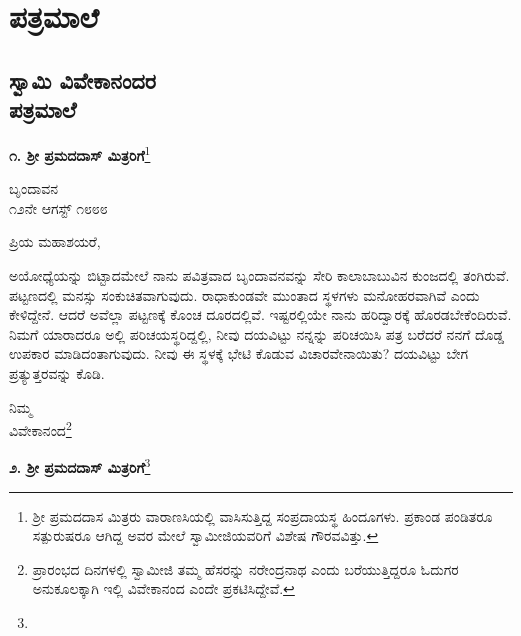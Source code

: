 

\part{ಪತ್ರಮಾಲೆ}

\vskip -0.5cm

\chapter[ಸ್ವಾಮಿ ವಿವೇಕಾನಂದರ ಪತ್ರಮಾಲೆ]{ಸ್ವಾಮಿ ವಿವೇಕಾನಂದರ\\ಪತ್ರಮಾಲೆ}

\begin{center}
\textbf{೧. ಶ‍್ರೀ ಪ್ರಮದದಾಸ್ ಮಿತ್ರರಿಗೆ}\footnote{ಶ‍್ರೀ ಪ್ರಮದದಾಸ ಮಿತ್ರರು ವಾರಾಣಸಿಯಲ್ಲಿ ವಾಸಿಸುತ್ತಿದ್ದ ಸಂಪ್ರದಾಯಸ್ಥ ಹಿಂದೂಗಳು. ಪ್ರಕಾಂಡ ಪಂಡಿತರೂ ಸತ್ಪುರುಷರೂ ಆಗಿದ್ದ ಅವರ ಮೇಲೆ ಸ್ವಾಮೀಜಿಯವರಿಗೆ ವಿಶೇಷ ಗೌರವವಿತ್ತು.}
\end{center}

\vspace{-0.7cm}
\begin{flushright}
ಬೃಂದಾವನ\\೧೨ನೇ ಆಗಸ್ಟ್ ೧೮೮೮
\end{flushright}

\noindent
ಪ್ರಿಯ ಮಹಾಶಯರೆ,

ಅಯೋಧ್ಯೆಯನ್ನು ಬಿಟ್ಟಾದಮೇಲೆ ನಾನು ಪವಿತ್ರವಾದ ಬೃಂದಾವನವನ್ನು ಸೇರಿ ಕಾಲಾಬಾಬುವಿನ ಕುಂಜದಲ್ಲಿ ತಂಗಿರುವೆ. ಪಟ್ಟಣದಲ್ಲಿ ಮನಸ್ಸು ಸಂಕುಚಿತವಾಗುವುದು. ರಾಧಾಕುಂಡವೇ ಮುಂತಾದ ಸ್ಥಳಗಳು ಮನೋಹರವಾಗಿವೆ ಎಂದು ಕೇಳಿದ್ದೇನೆ. ಆದರೆ ಅವೆಲ್ಲಾ ಪಟ್ಟಣಕ್ಕೆ ಕೊಂಚ ದೂರದಲ್ಲಿವೆ. ಇಷ್ಟರಲ್ಲಿಯೇ ನಾನು ಹರಿದ್ವಾರಕ್ಕೆ ಹೊರಡಬೇಕೆಂದಿರುವೆ. ನಿಮಗೆ ಯಾರಾದರೂ ಅಲ್ಲಿ ಪರಿಚಯಸ್ಥರಿದ್ದಲ್ಲಿ, ನೀವು ದಯವಿಟ್ಟು ನನ್ನನ್ನು ಪರಿಚಯಿಸಿ ಪತ್ರ ಬರೆದರೆ ನನಗೆ ದೊಡ್ಡ ಉಪಕಾರ ಮಾಡಿದಂತಾಗುವುದು. ನೀವು ಈ ಸ್ಥಳಕ್ಕೆ ಭೇಟಿ ಕೊಡುವ ವಿಚಾರವೇನಾಯಿತು? ದಯವಿಟ್ಟು ಬೇಗ ಪ್ರತ್ಯುತ್ತರವನ್ನು ಕೊಡಿ.

\vspace{-0.5cm}

{\flushright
ನಿಮ್ಮ\\ವಿವೇಕಾನಂದ\footnote{ಪ್ರಾರಂಭದ ದಿನಗಳಲ್ಲಿ ಸ್ವಾಮೀಜಿ ತಮ್ಮ ಹೆಸರನ್ನು ನರೇಂದ್ರನಾಥ ಎಂದು ಬರೆಯುತ್ತಿದ್ದರೂ ಓದುಗರ ಅನುಕೂಲಕ್ಕಾಗಿ ಇಲ್ಲಿ ವಿವೇಕಾನಂದ ಎಂದೇ ಪ್ರಕಟಿಸಿದ್ದೇವೆ.

}\par}

\vspace{-0.3cm}

\begin{center}
\textbf{೨. ಶ‍್ರೀ ಪ್ರಮದದಾಸ್ ಮಿತ್ರರಿಗೆ}\footnote{}
\end{center}

